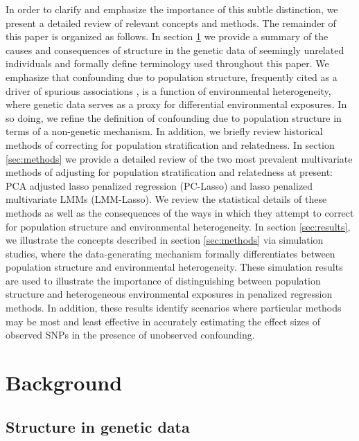 In order to clarify and emphasize the importance of this subtle distinction, we present a detailed review of relevant concepts and methods. The remainder of this paper is organized as follows. In section \ref{sec:background} we provide a summary of the causes and consequences of structure in the genetic data of seemingly unrelated individuals and formally define terminology used throughout this paper. We emphasize that confounding due to population structure, frequently cited as a driver of spurious associations \citep{Sillanpaeae2011, sul2018population}, is a function of environmental heterogeneity, where genetic data serves as a proxy for differential environmental exposures. In so doing, we refine the definition of confounding due to population structure in terms of a non-genetic mechanism. In addition, we briefly review historical methods of correcting for population stratification and relatedness. In section \ref{sec:methods} we provide a detailed review of the two most prevalent multivariate methods of adjusting for population stratification and relatedness at present: PCA adjusted lasso penalized regression (PC-Lasso) and lasso penalized multivariate LMMs (LMM-Lasso). We review the statistical details of these methods as well as the consequences of the ways in which they attempt to correct for population structure and environmental heterogeneity. In section \ref{sec:results}, we illustrate the concepts described in section \ref{sec:methods} via simulation studies, where the data-generating mechanism formally differentiates between population structure and environmental heterogeneity. These simulation results are used to illustrate the importance of distinguishing between population structure and heterogeneous environmental exposures in penalized regression methods. In addition, these results identify scenarios where particular methods may be most and least effective in accurately estimating the effect sizes of observed SNPs in the presence of unobserved confounding.




\section{Background} \label{sec:background}

\subsection{Structure in genetic data}

